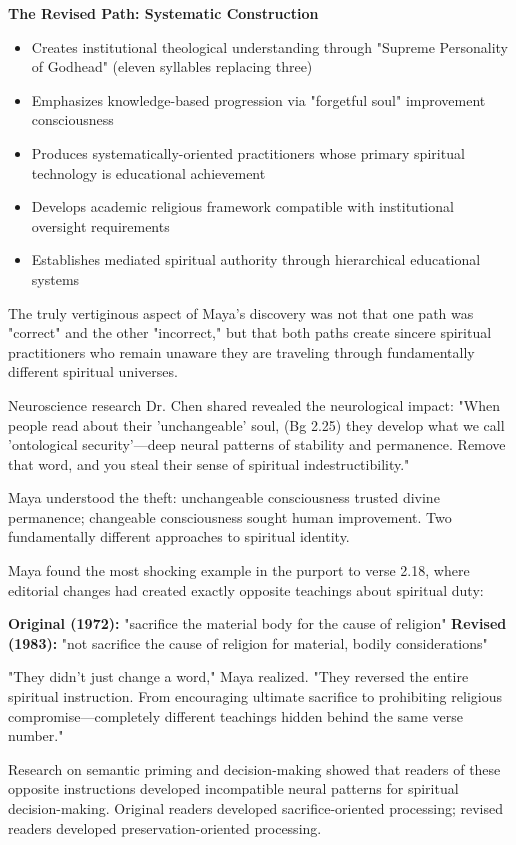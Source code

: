 \documentclass[12pt,twoside]{book}
\begin{document}
\textbf{\textbf{The Revised Path: Systematic Construction}}  
\begin{itemize}
\item Creates institutional theological understanding through "Supreme Personality of Godhead" (eleven syllables replacing three)
\item Emphasizes knowledge-based progression via "forgetful soul" improvement consciousness
\item Produces systematically-oriented practitioners whose primary spiritual technology is educational achievement
\item Develops academic religious framework compatible with institutional oversight requirements
\item Establishes mediated spiritual authority through hierarchical educational systems
\end{itemize}

The truly vertiginous aspect of Maya's discovery was not that one path was "correct" and the other "incorrect," but that both paths create sincere spiritual practitioners who remain unaware they are traveling through fundamentally different spiritual universes.

Neuroscience research Dr. Chen shared revealed the neurological impact: "When people read about their 'unchangeable' soul, (Bg 2.25) they develop what we call 'ontological security'—deep neural patterns of stability and permanence. Remove that word, and you steal their sense of spiritual indestructibility."

Maya understood the theft: unchangeable consciousness trusted divine permanence; changeable consciousness sought human improvement. Two fundamentally different approaches to spiritual identity.

Maya found the most shocking example in the purport to verse 2.18, where editorial changes had created exactly opposite teachings about spiritual duty:

\textbf{\textbf{Original (1972):}} "sacrifice the material body for the cause of religion"
\textbf{\textbf{Revised (1983):}} "not sacrifice the cause of religion for material, bodily considerations"

"They didn't just change a word," Maya realized. "They reversed the entire spiritual instruction. From encouraging ultimate sacrifice to prohibiting religious compromise—completely different teachings hidden behind the same verse number."

Research on semantic priming and decision-making showed that readers of these opposite instructions developed incompatible neural patterns for spiritual decision-making. Original readers developed sacrifice-oriented processing; revised readers developed preservation-oriented processing.
\end{document}
